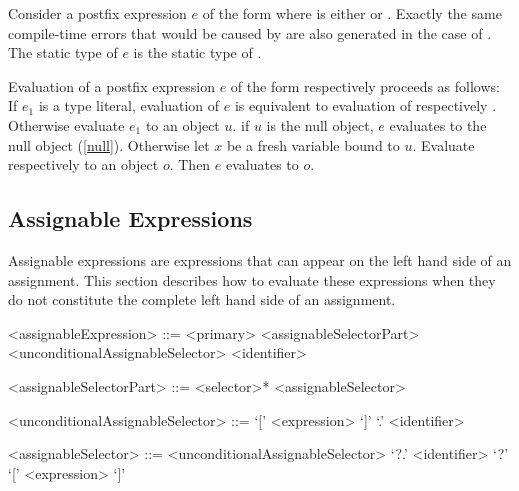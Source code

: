 \documentclass[makeidx]{article}
\begin{document}
{\LMHash{}%
Consider a postfix expression $e$ of the form 
where \op{} is either \lit{++} or \lit{-{}-}.
Exactly the same compile-time errors that would be caused by 
are also generated in the case of .
The static type of $e$ is the static type of .

\LMHash{}%
Evaluation of a postfix expression $e$
of the form  respectively 
proceeds as follows:
If $e_1$ is a type literal, evaluation of $e$ is equivalent to
evaluation of  respectively .
Otherwise evaluate $e_1$ to an object $u$.
if $u$ is the null object, $e$ evaluates to the null object (\ref{null}).
Otherwise let $x$ be a fresh variable bound to $u$.
Evaluate  respectively  to an object $o$.
Then $e$ evaluates to $o$.
\EndCase


\subsection{Assignable Expressions}

\LMHash{}%
Assignable expressions are expressions that can appear on the left hand side of an assignment.
This section describes how to evaluate these expressions when they do not constitute the complete left hand side of an assignment.


\begin{grammar}
<assignableExpression> ::= <primary> <assignableSelectorPart>
  \alt \SUPER{} <unconditionalAssignableSelector>
  \alt <identifier>

<assignableSelectorPart> ::= <selector>* <assignableSelector>

<unconditionalAssignableSelector> ::= `[' <expression> `]'
  \alt `.' <identifier>

<assignableSelector> ::= <unconditionalAssignableSelector>
  \alt `?.' <identifier>
  \alt `?' `[' <expression> `]'

\end{grammar}

}
\end{document}
